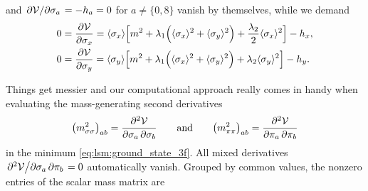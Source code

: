 and $\pdv{\mathcal{V}}/{\sigma_a} = -h_a = 0$ for $a \neq \{0,8\}$ vanish by themselves,
while we demand
\begin{subequations}
\begin{align}
	0 &= \pdv{\mathcal{V}}{\sigma_x} = \langle \sigma_x \rangle \Big[ m^2 + \lambda_1 \Big( \langle \sigma_x \rangle^2 + \langle \sigma_y \rangle^2 \Big) + \frac{\lambda_2}{2} \langle \sigma_x \rangle^2 \Big] - h_x, \\
	0 &= \pdv{\mathcal{V}}{\sigma_y} = \langle \sigma_y \rangle \Big[ m^2 + \lambda_1 \Big( \langle \sigma_x \rangle^2 + \langle \sigma_y \rangle^2 \Big) + \lambda_2 \langle \sigma_y \rangle^2 \Big] - h_y.
\end{align}
\label{eq:lsm3f:symmetry_breakers}%
\end{subequations}

Things get messier and our computational approach really comes in handy when evaluating the mass-generating second derivatives
\begin{equation}
	\big(m^2_{\sigma\sigma}\big)_{ab} = \pdv{\mathcal{V}}{\sigma_a, \sigma_b}
	\qquad \text{and} \qquad
	\big(m^2_{\pi\pi}\big)_{ab}       = \pdv{\mathcal{V}}{\pi_a, \pi_b}
\end{equation}
in the minimum \eqref{eq:lsm:ground_state_3f}.
All mixed derivatives $\pdv{\mathcal{V}}/{\sigma_a,\pi_b} = 0$ automatically vanish.
Grouped by common values, the nonzero entries of the scalar mass matrix are
